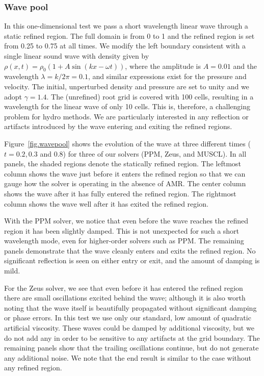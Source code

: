 \subsubsection{Wave pool}
\label{sec.tests.wavepool}

In this one-dimensional test we pass a short wavelength linear wave through a static refined region.  The full domain is from 0 to 1 and the refined region is set from 0.25 to 0.75 at all times.  We modify the left boundary consistent with a single linear sound wave with density given by $\rho(x,t) = \rho_0 (1 + A \sin(kx - \omega t))$, where the amplitude is $A = 0.01$ and the wavelength $\lambda = k/2\pi = 0.1$, and similar expressions exist for the pressure and velocity.  The initial, unperturbed density and pressure are set to unity and we adopt $\gamma = 1.4$.  The (unrefined) root grid is covered with 100 cells, resulting in a wavelength for the linear wave of only 10 cells.  This is, therefore, a challenging problem for hydro methods.  We are particularly interested in any reflection or artifacts introduced by the wave entering and exiting the refined regions.

Figure~\ref{fig.wavepool} shows the evolution of the wave at three different times ($t = 0.2, 0.3$ and 0.8) for three of our solvers (PPM, Zeus, and MUSCL).  In all panels, the shaded regions denote the statically refined region. The leftmost column shows the wave just before it enters the refined region so that we can gauge how the solver is operating in the absence of AMR.  The center column shows the wave after it has fully entered the refined region.  The rightmost column shows the wave well after it has exited the refined region.

With the PPM solver, we notice that even before the wave reaches the refined region it has been slightly damped. This is not unexpected for such a short wavelength mode, even for higher-order solvers such as PPM.  The remaining panels demonstrate that the wave cleanly enters and exits the refined region.  No significant reflection is seen on either entry or exit, and the amount of damping is mild.

For the Zeus solver, we see that even before it has entered the refined region there are small oscillations excited behind the wave; although it is also worth noting that the wave itself is beautifully propagated without significant damping or phase errors.  In this test we use only our standard, low amount of quadratic artificial viscosity.  These waves could be damped by additional viscosity, but we do not add any in order to be sensitive to any artifacts at the grid boundary.  The remaining panels show that the trailing oscillations continue, but do not generate any additional noise. We note that the end result is similar to the case without any refined region.

